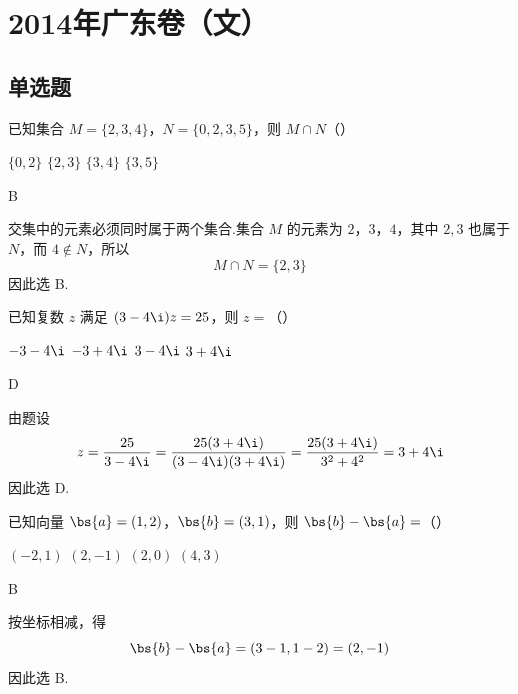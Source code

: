 \chapter{2014年广东卷（文）}

\section{单选题}

\begin{problem}
已知集合 \(M = \{2, 3, 4\}\)，\(N = \{0, 2, 3, 5\}\)，则 \(M \cap N\)（\quad）

\choices
    {\(\{0, 2\}\)}
    {\(\{2, 3\}\)}
    {\(\{3, 4\}\)}
    {\(\{3, 5\}\)}
\end{problem}

\begin{answer}
B
\end{answer}

\begin{solution}
交集中的元素必须同时属于两个集合.集合 \(M\) 的元素为 \(2\)，\(3\)，\(4\)，其中 \(2,3\) 也属于 \(N\)，而 \(4\notin N\)，所以
\[
M\cap N=\{2,3\}
\]
因此选 B.
\end{solution}

\begin{problem}
已知复数 \(z\) 满足 \((3 - 4\i)z = 25\)，则 \(z =\)（\quad）

\choices
    {\(-3 - 4\i\)}
    {\(-3 + 4\i\)}
    {\(3 - 4\i\)}
    {\(3 + 4\i\)}
\end{problem}

\begin{answer}
D
\end{answer}

\begin{solution}
由题设
\[
z=\frac{25}{3-4\i}=\frac{25(3+4\i)}{(3-4\i)(3+4\i)}
 =\frac{25(3+4\i)}{3^2+4^2}=3+4\i
\]
因此选 D.
\end{solution}

\begin{problem}
已知向量 \(\bs{a} = (1, 2)\)，\(\bs{b} = (3, 1)\)，则 \(\bs{b} - \bs{a} =\)（\quad）

\choices
    {\((-2, 1)\)}
    {\((2, -1)\)}
    {\((2, 0)\)}
    {\((4, 3)\)}
\end{problem}

\begin{answer}
B
\end{answer}

\begin{solution}
按坐标相减，得
\[
\bs{b}-\bs{a}=(3-1,1-2)=(2,-1)
\]
因此选 B.
\end{solution}

